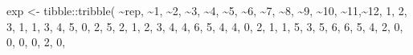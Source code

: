 \documentclass[
  letterpaper,
  DIV=11,
  numbers=noendperiod]{scrreprt}
\newenvironment{Shaded}{\begin{snugshade}}{\end{snugshade}}
\newcommand{\AttributeTok}[1]{\textcolor[rgb]{0.40,0.45,0.13}{#1}}
\newcommand{\DecValTok}[1]{\textcolor[rgb]{0.68,0.00,0.00}{#1}}
\newcommand{\FunctionTok}[1]{\textcolor[rgb]{0.28,0.35,0.67}{#1}}
\newcommand{\NormalTok}[1]{\textcolor[rgb]{0.00,0.23,0.31}{#1}}
\newcommand{\OtherTok}[1]{\textcolor[rgb]{0.00,0.23,0.31}{#1}}
\newcommand{\SpecialCharTok}[1]{\textcolor[rgb]{0.37,0.37,0.37}{#1}}
\newcommand{\StringTok}[1]{\textcolor[rgb]{0.13,0.47,0.30}{#1}}
\begin{document}
\begin{Shaded}
\begin{Highlighting}[]
\NormalTok{exp }\OtherTok{\textless{}{-}}\NormalTok{ tibble}\SpecialCharTok{::}\FunctionTok{tribble}\NormalTok{(}
  \SpecialCharTok{\textasciitilde{}}\NormalTok{rep, }\SpecialCharTok{\textasciitilde{}}\StringTok{\textasciigrave{}}\AttributeTok{1}\StringTok{\textasciigrave{}}\NormalTok{, }\SpecialCharTok{\textasciitilde{}}\StringTok{\textasciigrave{}}\AttributeTok{2}\StringTok{\textasciigrave{}}\NormalTok{, }\SpecialCharTok{\textasciitilde{}}\StringTok{\textasciigrave{}}\AttributeTok{3}\StringTok{\textasciigrave{}}\NormalTok{, }\SpecialCharTok{\textasciitilde{}}\StringTok{\textasciigrave{}}\AttributeTok{4}\StringTok{\textasciigrave{}}\NormalTok{, }\SpecialCharTok{\textasciitilde{}}\StringTok{\textasciigrave{}}\AttributeTok{5}\StringTok{\textasciigrave{}}\NormalTok{, }\SpecialCharTok{\textasciitilde{}}\StringTok{\textasciigrave{}}\AttributeTok{6}\StringTok{\textasciigrave{}}\NormalTok{, }\SpecialCharTok{\textasciitilde{}}\StringTok{\textasciigrave{}}\AttributeTok{7}\StringTok{\textasciigrave{}}\NormalTok{, }\SpecialCharTok{\textasciitilde{}}\StringTok{\textasciigrave{}}\AttributeTok{8}\StringTok{\textasciigrave{}}\NormalTok{, }\SpecialCharTok{\textasciitilde{}}\StringTok{\textasciigrave{}}\AttributeTok{9}\StringTok{\textasciigrave{}}\NormalTok{, }\SpecialCharTok{\textasciitilde{}}\StringTok{\textasciigrave{}}\AttributeTok{10}\StringTok{\textasciigrave{}}\NormalTok{, }\SpecialCharTok{\textasciitilde{}}\StringTok{\textasciigrave{}}\AttributeTok{11}\StringTok{\textasciigrave{}}\NormalTok{,}\SpecialCharTok{\textasciitilde{}}\StringTok{\textasciigrave{}}\AttributeTok{12}\StringTok{\textasciigrave{}}\NormalTok{,}
  \DecValTok{1}\NormalTok{, }\DecValTok{2}\NormalTok{, }\DecValTok{3}\NormalTok{, }\DecValTok{1}\NormalTok{, }\DecValTok{1}\NormalTok{, }\DecValTok{3}\NormalTok{, }\DecValTok{4}\NormalTok{, }\DecValTok{5}\NormalTok{, }\DecValTok{0}\NormalTok{, }\DecValTok{2}\NormalTok{, }\DecValTok{5}\NormalTok{, }\DecValTok{2}\NormalTok{, }\DecValTok{1}\NormalTok{,}
  \DecValTok{2}\NormalTok{, }\DecValTok{3}\NormalTok{, }\DecValTok{4}\NormalTok{, }\DecValTok{4}\NormalTok{, }\DecValTok{6}\NormalTok{, }\DecValTok{5}\NormalTok{, }\DecValTok{4}\NormalTok{, }\DecValTok{4}\NormalTok{, }\DecValTok{0}\NormalTok{, }\DecValTok{2}\NormalTok{, }\DecValTok{1}\NormalTok{, }\DecValTok{1}\NormalTok{, }\DecValTok{5}\NormalTok{,}
  \DecValTok{3}\NormalTok{, }\DecValTok{5}\NormalTok{, }\DecValTok{6}\NormalTok{, }\DecValTok{6}\NormalTok{, }\DecValTok{5}\NormalTok{, }\DecValTok{4}\NormalTok{, }\DecValTok{2}\NormalTok{, }\DecValTok{0}\NormalTok{, }\DecValTok{0}\NormalTok{, }\DecValTok{0}\NormalTok{, }\DecValTok{0}\NormalTok{, }\DecValTok{2}\NormalTok{, }\DecValTok{0}\NormalTok{,}

\end{Highlighting}
\end{Shaded}
\end{document}
